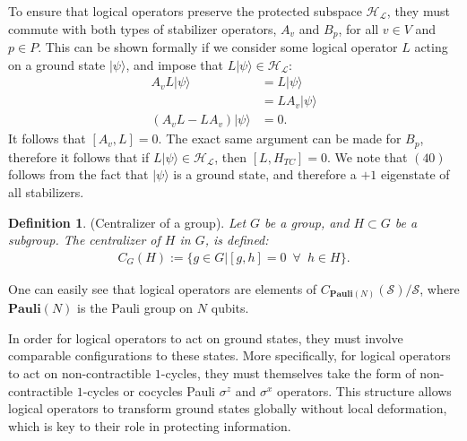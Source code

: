 \documentclass[12pt]{article}
\theoremstyle{definition}
\newtheorem{definition}[theorem]{Definition}
\begin{document}
To ensure that logical operators preserve the protected subspace $\mathcal{H_L}$, they must commute with both types of stabilizer operators, $A_v$ and $B_p$, for all $v\in V$ and $p\in P$. This can be shown formally if we consider some logical operator $L$ acting on a ground state $|\psi\rangle$, and impose that $L|\psi\rangle\in\mathcal{H_L}$:
    \begin{align}
        A_vL|\psi\rangle &= L|\psi\rangle\\
        &= LA_v|\psi\rangle\\
        (A_vL-LA_v)|\psi\rangle &= 0.
    \end{align}
It follows that $[A_v,L] = 0$. The exact same argument can be made for $B_p$, therefore it follows that if $L|\psi\rangle\in\mathcal{H_L}$, then $[L,H_{TC}] = 0$. We note that $(40)$ follows from the fact that $|\psi\rangle$ is a ground state, and therefore a $+1$ eigenstate of all stabilizers.
    \begin{definition}(Centralizer of a group).
        \emph{Let $G$ be a group, and $H\subset G$ be a subgroup. The centralizer of $H$ in $G$, is defined:}
            \begin{align}
                C_G(H) := \{g\in G|[g,h] = 0\enspace\forall\enspace h\in H\}.
            \end{align}
    \end{definition}
One can easily see that logical operators are elements of $C_{\textbf{Pauli}(N)}(\mathcal{S})/\mathcal{S}$, where $\textbf{Pauli}(N)$ is the Pauli group on $N$ qubits.\newline

In order for logical operators to act on ground states, they must involve comparable configurations to these states. More specifically, for logical operators to act on non-contractible $1$-cycles, they must themselves take the form of non-contractible $1$-cycles or cocycles Pauli $\sigma^z$ and $\sigma^x$ operators. This structure allows logical operators to transform ground states globally without local deformation, which is key to their role in protecting information.\newline
\end{document}
